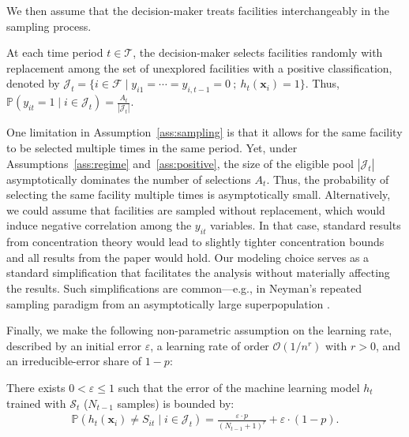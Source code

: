 \documentclass[nonblindrev]{informs3noheader}
\def\P{\mathbb{P}}
\def\calF{\mathcal{F}}
\def\calJ{\mathcal{J}}
\def\calO{\mathcal{O}}
\def\calS{\mathcal{S}}
\def\calT{\mathcal{T}}
\def\bx{\boldsymbol{x}}
\begin{document}
We then assume that the decision-maker treats facilities interchangeably in the sampling process.

\begin{assumption}[Sampling]\label{ass:sampling}
    At each time period $t\in\calT$, the decision-maker selects facilities randomly with replacement among the set of unexplored facilities with a positive classification, denoted by $\calJ_t=\{i\in\calF\mid y_{i1}=\cdots=y_{i,t-1}=0\ ;\ h_t(\bx_{i})=1\}$. Thus, $\P\left(y_{it}=1 \mid i \in \calJ_t\right)= 
    \frac{A_t}{|\calJ_t|}$.
\end{assumption}

One limitation in Assumption~\ref{ass:sampling} is that it allows for the same facility to be selected multiple times in the same period. Yet, under Assumptions~\ref{ass:regime} and~\ref{ass:positive}, the size of the eligible pool $|\calJ_t|$ asymptotically dominates the number of selections $A_t$. Thus, the probability of selecting the same facility multiple times is asymptotically small. Alternatively, we could assume that facilities are sampled without replacement, which would induce negative correlation among the $y_{it}$ variables. In that case, standard results from concentration theory \citep{serfling1974probability, bardenet2015concentration} would lead to slightly tighter concentration bounds and all results from the paper would hold. Our modeling choice serves as a standard simplification that facilitates the analysis without materially affecting the results. Such simplifications are common—e.g., in Neyman's repeated sampling paradigm from an asymptotically large superpopulation \citep{Neyman1934,SarndalSwenssonWretman1992}.

Finally, we make the following non-parametric assumption on the learning rate, described by an initial error $\varepsilon$, a learning rate of order $\calO(1/n^{r})$ with $r>0$, and an irreducible-error share of $1-p$:
\begin{assumption} \label{ass:classification}
    There exists $0<\varepsilon\leq 1$ such that the error of the machine learning model $h_t$ trained with $\calS_t$ ($N_{t-1}$ samples) is bounded by:
    \begin{align*}
        \P(h_t(\bx_{i})\neq S_{it} \mid i \in \calJ_t)=\frac{\varepsilon\cdot p}{\left(N_{t-1} + 1\right)^r}+\varepsilon\cdot(1-p).
    \end{align*}
\end{assumption}
\end{document}
